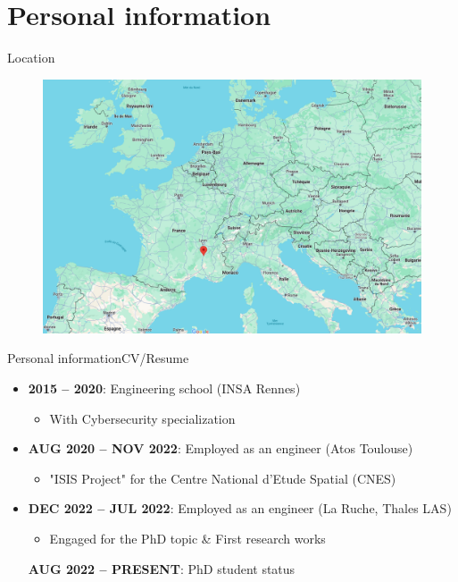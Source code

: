 

\addtocounter{framenumber}{-1}

\section{Personal information}

\begin{frame}{Location}
    \centering
    \begin{figure}
        \includegraphics[width=0.7\linewidth]{figures/where_am_i.png}
    \end{figure}

\end{frame}

\begin{frame}{Personal information}{CV/Resume}

    \begin{itemize}
        \item \textbf{2015 – 2020}: Engineering school (INSA Rennes)
              \begin{itemize}
                  \item With Cybersecurity specialization
              \end{itemize}
        \item \textbf{AUG 2020 – NOV 2022}: Employed as an engineer (Atos Toulouse)
              \begin{itemize}
                  \item "ISIS Project" for the Centre National d’Etude Spatial (CNES)
              \end{itemize}
        \item \textbf{DEC 2022 – JUL 2022}: Employed as an engineer (La Ruche, Thales LAS)
              \begin{itemize}
                  \item Engaged for the PhD topic \& First research works
              \end{itemize}
              \textbf{AUG 2022 – PRESENT}: PhD student status
    \end{itemize}

\end{frame}


